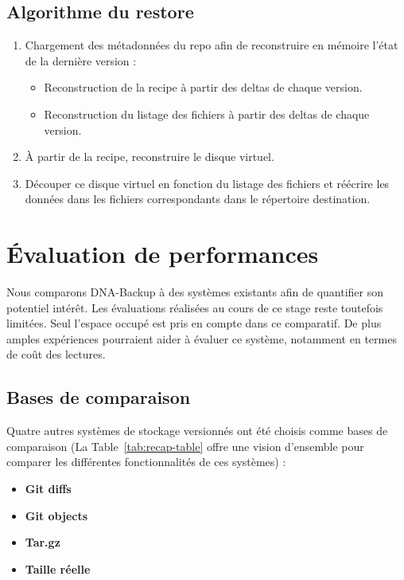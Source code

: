 \documentclass[a4paper]{report}
\begin{document}
\section{Algorithme du restore}

\begin{enumerate}
\item
  Chargement des métadonnées du repo afin de reconstruire en
  mémoire l'état de la dernière version :

  \begin{itemize}
  \item
    Reconstruction de la recipe à partir des deltas de chaque version.
  \item
    Reconstruction du listage des fichiers à partir des deltas de chaque version.
  \end{itemize}
\item
  À partir de la recipe, reconstruire le disque virtuel.
\item
  Découper ce disque virtuel en fonction du listage des fichiers
  et réécrire les données dans les fichiers correspondants dans le répertoire destination.
\end{enumerate}


\chapter{Évaluation de performances}

Nous comparons DNA-Backup à des systèmes existants
afin de quantifier son potentiel intérêt.
Les évaluations réalisées au cours de ce stage reste toutefois limitées.
Seul l'espace occupé est pris en compte dans ce comparatif.
De plus amples expériences pourraient aider à évaluer ce système,
notamment en termes de coût des lectures.

\section{Bases de comparaison}

Quatre autres systèmes de stockage versionnés ont été choisis comme bases de comparaison
(La Table~\ref{tab:recap-table} offre une vision d'ensemble
pour comparer les différentes fonctionnalités de ces systèmes) :
\begin{itemize}
\item \textbf{Git diffs}
\item \textbf{Git objects}
\item \textbf{Tar.gz}
\item \textbf{Taille réelle}
\end{itemize}
\end{document}
